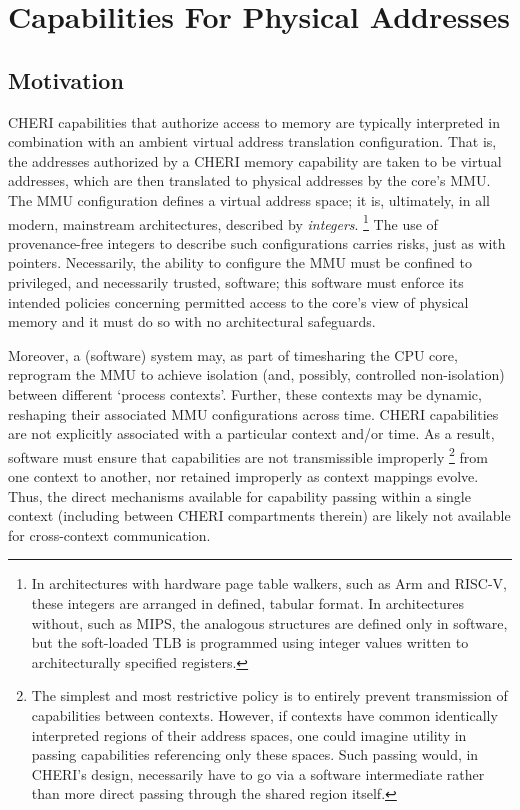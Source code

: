 
\section{Capabilities For Physical Addresses} %
\label{app:exp:physcap}

\subsection{Motivation}

CHERI capabilities that authorize access to memory are typically interpreted
in combination with an ambient virtual address translation configuration.
That is, the addresses authorized by a CHERI memory capability are taken to
be virtual addresses, which are then translated to physical addresses by the
core's MMU.  The MMU configuration defines a virtual address space; it is,
ultimately, in all modern, mainstream architectures, described by
\emph{integers}.%
%
\footnote{In architectures with hardware page table walkers, such as Arm and
RISC-V, these integers are arranged in defined, tabular format.  In
architectures without, such as MIPS, the analogous structures are defined
only in software, but the soft-loaded TLB is programmed using integer
values written to architecturally specified registers.}
%
The use of provenance-free integers to describe such configurations carries
risks, just as with pointers.  Necessarily, the ability to configure the MMU
must be confined to privileged, and necessarily trusted, software; this
software must enforce its intended policies concerning permitted access to
the core's view of physical memory and it must do so with no architectural
safeguards.

Moreover, a (software) system may, as part of timesharing the CPU core,
reprogram the MMU to achieve isolation (and, possibly, controlled
non-isolation) between different `process contexts'.  Further, these
contexts may be dynamic, reshaping their associated MMU configurations
across time.  CHERI capabilities are not explicitly associated with a
particular context and/or time.  As a result, software must ensure that
capabilities are not transmissible improperly%
%
\footnote{The simplest and most restrictive policy is to entirely prevent
transmission of capabilities between contexts.  However, if contexts have
common identically interpreted regions of their address spaces, one could
imagine utility in passing capabilities referencing only these spaces.  Such
passing would, in CHERI's design, necessarily have to go via a software
intermediate rather than more direct passing through the shared region
itself.}
%
from one context to another, nor retained improperly as context mappings
evolve.  Thus, the direct mechanisms available for capability passing within
a single context (including between CHERI compartments therein) are likely
not available for cross-context communication.

